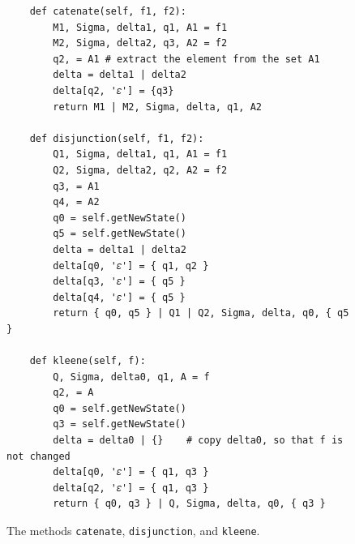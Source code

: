 \begin{figure}[!ht]
\centering
\begin{verbatim}
    def catenate(self, f1, f2):
        M1, Sigma, delta1, q1, A1 = f1
        M2, Sigma, delta2, q3, A2 = f2
        q2, = A1 # extract the element from the set A1
        delta = delta1 | delta2
        delta[q2, '𝜀'] = {q3}
        return M1 | M2, Sigma, delta, q1, A2

    def disjunction(self, f1, f2):
        Q1, Sigma, delta1, q1, A1 = f1
        Q2, Sigma, delta2, q2, A2 = f2
        q3, = A1
        q4, = A2
        q0 = self.getNewState()
        q5 = self.getNewState()
        delta = delta1 | delta2
        delta[q0, '𝜀'] = { q1, q2 }
        delta[q3, '𝜀'] = { q5 }
        delta[q4, '𝜀'] = { q5 }
        return { q0, q5 } | Q1 | Q2, Sigma, delta, q0, { q5 }

    def kleene(self, f):
        Q, Sigma, delta0, q1, A = f
        q2, = A
        q0 = self.getNewState()
        q3 = self.getNewState()
        delta = delta0 | {}    # copy delta0, so that f is not changed
        delta[q0, '𝜀'] = { q1, q3 }
        delta[q2, '𝜀'] = { q1, q3 }
        return { q0, q3 } | Q, Sigma, delta, q0, { q3 }
\end{verbatim}
\vspace*{-0.3cm}
\caption{The methods \texttt{catenate}, \texttt{disjunction}, and \texttt{kleene}.}
\label{fig:03-Regexp-2-NFA.ipynb:catenate}
\end{figure}

